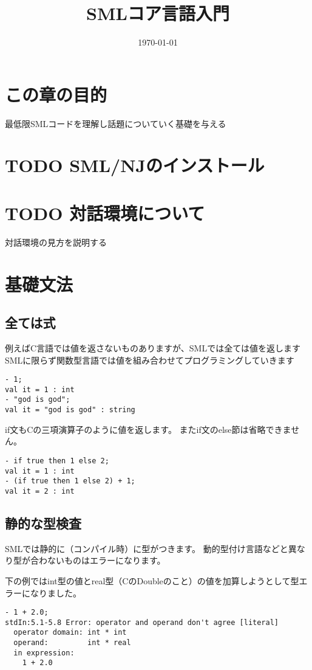 \documentclass[11pt]{article}
\date{\today}
\title{SMLコア言語入門}
\begin{document}
\maketitle
\tableofcontents


\section{この章の目的}
\label{sec-1}
最低限SMLコードを理解し話題についていく基礎を与える
\section{{\bfseries\sffamily TODO} SML/NJのインストール}
\label{sec-2}

\section{{\bfseries\sffamily TODO} 対話環境について}
\label{sec-3}
対話環境の見方を説明する
\section{基礎文法}
\label{sec-4}
\subsection{全ては式}
\label{sec-4-1}
例えばC言語では値を返さないものありますが、SMLでは全ては値を返します
SMLに限らず関数型言語では値を組み合わせてプログラミングしていきます
\begin{verbatim}
- 1;
val it = 1 : int
- "god is god";
val it = "god is god" : string
\end{verbatim}

if文もCの三項演算子のように値を返します。
またif文のelse節は省略できません。
\begin{verbatim}
- if true then 1 else 2;
val it = 1 : int
- (if true then 1 else 2) + 1;
val it = 2 : int
\end{verbatim}

\subsection{静的な型検査}
\label{sec-4-2}
SMLでは静的に（コンパイル時）に型がつきます。
動的型付け言語などと異なり型が合わないものはエラーになります。

下の例ではint型の値とreal型（CのDoubleのこと）の値を加算しようとして型エラーになりました。
\begin{verbatim}
- 1 + 2.0;
stdIn:5.1-5.8 Error: operator and operand don't agree [literal]
  operator domain: int * int
  operand:         int * real
  in expression:
    1 + 2.0
\end{verbatim}
\end{document}
